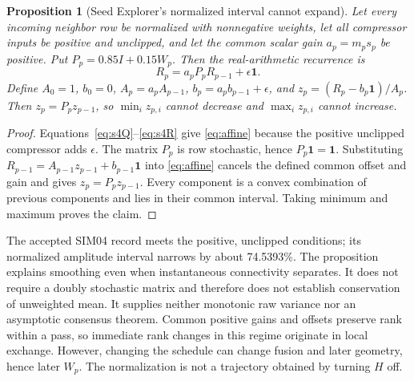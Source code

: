 \documentclass[11pt,a4paper]{article}
\newtheorem{proposition}{Proposition}
\newcommand{\one}{\mathbf{1}}
\begin{document}
\begin{proposition}[Seed Explorer's normalized interval cannot expand]\label{prop:averaging}
Let every incoming neighbor row be normalized with nonnegative weights, let all compressor inputs be positive and unclipped, and let the common scalar gain $a_p=m_ps_p$ be positive. Put $P_p=0.85I+0.15W_p$. Then the real-arithmetic recurrence is
\begin{equation}
R_p=a_pP_pR_{p-1}+\epsilon\one.\label{eq:affine}
\end{equation}
Define $A_0=1$, $b_0=0$, $A_p=a_pA_{p-1}$, $b_p=a_pb_{p-1}+\epsilon$, and $z_p=(R_p-b_p\one)/A_p$. Then $z_p=P_pz_{p-1}$, so $\min_i z_{p,i}$ cannot decrease and $\max_i z_{p,i}$ cannot increase.
\end{proposition}
\begin{proof}
Equations~\eqref{eq:s4Q}--\eqref{eq:s4R} give \eqref{eq:affine} because the positive unclipped compressor adds $\epsilon$. The matrix $P_p$ is row stochastic, hence $P_p\one=\one$. Substituting $R_{p-1}=A_{p-1}z_{p-1}+b_{p-1}\one$ into \eqref{eq:affine} cancels the defined common offset and gain and gives $z_p=P_pz_{p-1}$. Every component is a convex combination of previous components and lies in their common interval. Taking minimum and maximum proves the claim.
\end{proof}
The accepted SIM04 record meets the positive, unclipped conditions; its normalized amplitude interval narrows by about 74.5393\%. The proposition explains smoothing even when instantaneous connectivity separates. It does not require a doubly stochastic matrix and therefore does not establish conservation of unweighted mean. It supplies neither monotonic raw variance nor an asymptotic consensus theorem. Common positive gains and offsets preserve rank within a pass, so immediate rank changes in this regime originate in local exchange. However, changing the schedule can change fusion and later geometry, hence later $W_p$. The normalization is not a trajectory obtained by turning $H$ off.
\end{document}
